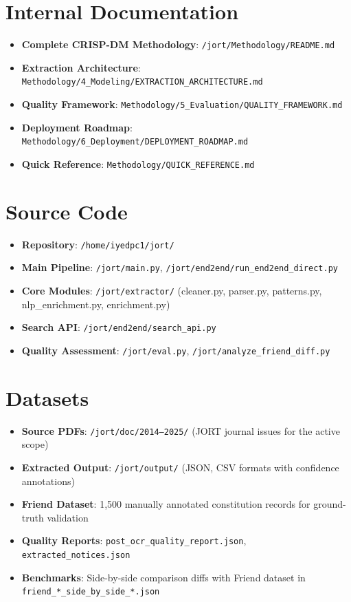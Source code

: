 \documentclass[12pt,a4paper]{report}
\begin{document}
\section{Internal Documentation}

\begin{itemize}
    \item \textbf{Complete CRISP-DM Methodology}: \texttt{/jort/Methodology/README.md}
    \item \textbf{Extraction Architecture}: \texttt{Methodology/4\_Modeling/EXTRACTION\_ARCHITECTURE.md}
    \item \textbf{Quality Framework}: \texttt{Methodology/5\_Evaluation/QUALITY\_FRAMEWORK.md}
    \item \textbf{Deployment Roadmap}: \texttt{Methodology/6\_Deployment/DEPLOYMENT\_ROADMAP.md}
    \item \textbf{Quick Reference}: \texttt{Methodology/QUICK\_REFERENCE.md}
\end{itemize}

\section{Source Code}

\begin{itemize}
    \item \textbf{Repository}: \texttt{/home/iyedpc1/jort/}
    \item \textbf{Main Pipeline}: \texttt{/jort/main.py}, \texttt{/jort/end2end/run\_end2end\_direct.py}
    \item \textbf{Core Modules}: \texttt{/jort/extractor/} (cleaner.py, parser.py, patterns.py, nlp\_enrichment.py, enrichment.py)
    \item \textbf{Search API}: \texttt{/jort/end2end/search\_api.py}
    \item \textbf{Quality Assessment}: \texttt{/jort/eval.py}, \texttt{/jort/analyze\_friend\_diff.py}
\end{itemize}

\section{Datasets}

\begin{itemize}
    \item \textbf{Source PDFs}: \texttt{/jort/doc/2014--2025/} (JORT journal issues for the active scope)
    \item \textbf{Extracted Output}: \texttt{/jort/output/} (JSON, CSV formats with confidence annotations)
    \item \textbf{Friend Dataset}: 1,500 manually annotated constitution records for ground-truth validation
    \item \textbf{Quality Reports}: \texttt{post\_ocr\_quality\_report.json}, \texttt{extracted\_notices.json}
    \item \textbf{Benchmarks}: Side-by-side comparison diffs with Friend dataset in \texttt{friend\_*\_side\_by\_side\_*.json}
\end{itemize}
\end{document}
